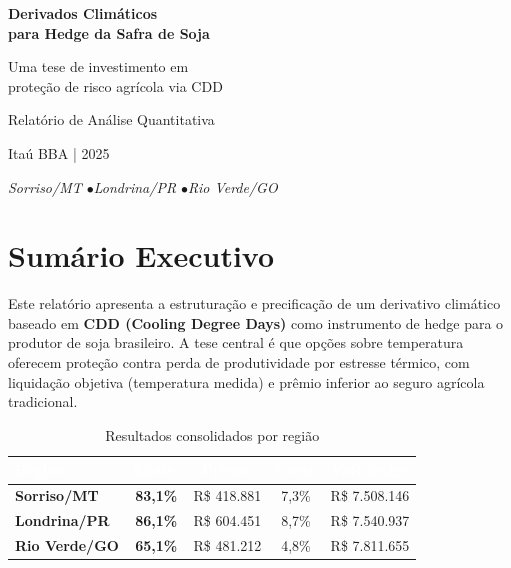 \documentclass[11pt,a4paper]{article}
\newcommand{\destaque}[1]{\textcolor{wolf_blue}{\textbf{#1}}}
\begin{document}
\begin{titlepage}
\color{white}
\pagecolor{wolf_blue}
\begin{center}
\vspace*{4cm}
{\Huge\bfseries Derivados Climáticos\\[0.3em]
para Hedge da Safra de Soja}

\vspace{1.5cm}
{\Large Uma tese de investimento em\\[0.2em]
proteção de risco agrícola via CDD}

\vspace{3cm}
{\large Relatório de Análise Quantitativa}

\vspace{0.5cm}
{\large Itaú BBA | 2025}

\vfill
{\small\itshape
Sorriso/MT \quad$\bullet$\quad Londrina/PR \quad$\bullet$\quad Rio Verde/GO}
\end{center}
\end{titlepage}
\nopagecolor
{}

\section{Sumário Executivo}

Este relatório apresenta a estruturação e precificação de um derivativo climático
baseado em \destaque{CDD (Cooling Degree Days)} como instrumento de hedge para o
produtor de soja brasileiro. A tese central é que opções sobre temperatura
oferecem proteção contra perda de produtividade por estresse térmico, com
liquidação objetiva (temperatura medida) e prêmio inferior ao seguro agrícola
tradicional.

\begin{table}[htbp]
\centering
\caption{Resultados consolidados por região}
\label{tab:resumo}
\small
\begin{tabular}{lcccc}
\toprule
\rowcolor{wolf_blue}\textcolor{white}{\textbf{Região}} &
\textcolor{white}{\textbf{Efetiv.}} &
\textcolor{white}{\textbf{Prêmio}} &
\textcolor{white}{\textbf{Custo}} &
\textcolor{white}{\textbf{VaR hedge}} \\
\midrule
\rowcolor{wolf_lightblue}
\textbf{Sorriso/MT} & \textbf{83,1\%} & R\$ 418.881 & 7,3\% & R\$ 7.508.146 \\
\rowcolor{wolf_lightblue}
\textbf{Londrina/PR} & \textbf{86,1\%} & R\$ 604.451 & 8,7\% & R\$ 7.540.937 \\
\rowcolor{wolf_lightblue}
\textbf{Rio Verde/GO} & \textbf{65,1\%} & R\$ 481.212 & 4,8\% & R\$ 7.811.655 \\
\bottomrule
\end{tabular}
\end{table}
\end{document}
